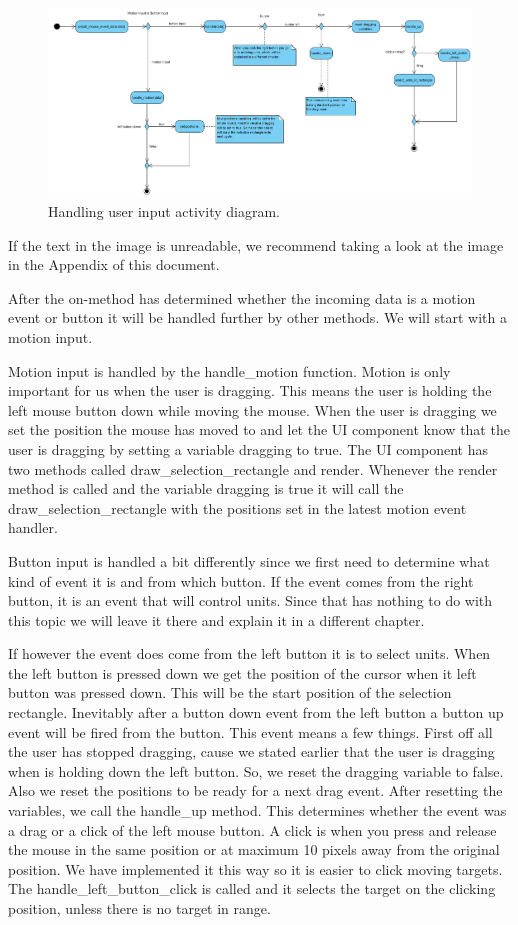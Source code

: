 \begin{figure}[!htb]
    \centering
    \includegraphics[scale=0.55]{res/ActivityDiagramMouseHandler.png}
    \caption{Handling user input activity diagram.}
\end{figure}

If the text in the image is unreadable, we recommend taking a look at the image in the Appendix of this document.

After the on-method has determined whether the incoming data is a motion event or button it will be handled further by other methods. We will start with a motion input.

Motion input is handled by the handle\_motion function. Motion is only important for us when the user is dragging. This means the user is holding the left mouse button down while moving the mouse. When the user is dragging we set the position the mouse has moved to and let the UI component know that the user is dragging by setting a variable dragging to true. The UI component has two methods called draw\_selection\_rectangle and render. Whenever the render method is called and the variable dragging is true it will call the draw\_selection\_rectangle with the positions set in the latest motion event handler.

Button input is handled a bit differently since we first need to determine what kind of event it is and from which button. If the event comes from the right button, it is an event that will control units. Since that has nothing to do with this topic we will leave it there and explain it in a different chapter. 

If however the event does come from the left button it is to select units. When the left button is pressed down we get the position of the cursor when it left button was pressed down. This will be the start position of the selection rectangle. Inevitably after a button down event from the left button a button up event will be fired from the button. This event means a few things. First off all the user has stopped dragging, cause we stated earlier that the user is dragging when is holding down the left button. So, we reset the dragging variable to false. Also we reset the positions to be ready for a next drag event. After resetting the variables, we call the handle\_up method. This determines whether the event was a drag or a click of the left mouse button. A click is when you press and release the mouse in the same position or at maximum 10 pixels away from the original position. We have implemented it this way so it is easier to click moving targets. The handle\_left\_button\_click is called and it selects the target on the clicking position, unless there is no target in range.

